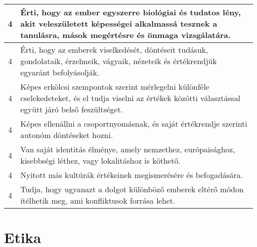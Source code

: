 \begin{longtable}{c | p{} }
                                
                                          4 &  Érti, hogy az ember egyszerre biológiai és tudatos lény, akit veleszületett képességei alkalmassá tesznek a tanulásra, mások megértésre és önmaga vizsgálatára. \\ \hline
                                          4 &  Érti, hogy az emberek viselkedését, döntéseit tudásuk, gondolataik, érzelmeik, vágyaik, nézeteik és értékrendjük egyaránt befolyásolják. \\ \hline
                                          4 &  Képes erkölcsi szempontok szerint mérlegelni különféle cselekedeteket, és el tudja viselni az értékek közötti választással együtt járó belső feszültséget. \\ \hline
                                          4 &  Képes ellenállni a csoportnyomásnak, és saját értékrendje szerinti autonóm döntéseket hozni. \\ \hline
                                          4 &  Van saját identitás élménye, amely nemzethez, európaisághoz, kisebbségi léthez, vagy lokalitáshoz is köthető. \\ \hline
                                          4 &  Nyitott más kultúrák értékeinek megismerésére és befogadására. \\ \hline
                                          4 &  Tudja, hogy ugyanazt a dolgot különböző emberek eltérő módon ítélhetik meg, ami konfliktusok forrása lehet. \\ \hline
                                      
                        \end{longtable}
            \clearpage

        \section{Etika}

